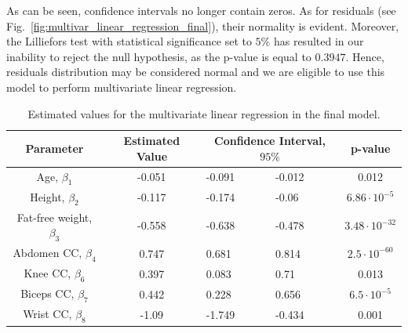 \documentclass[11pt,american,american]{article}
\begin{document}
\medskip

As can be seen, confidence intervals no longer contain zeros. As for residuals (see Fig.~\ref{fig:multivar_linear_regression_final}), their normality is evident. Moreover, the Lilliefors test with statistical significance set to $5\%$ has resulted in our inability to reject the null hypothesis, as the p-value is equal to $0.3947$. Hence, residuals distribution may be considered normal and we are eligible to use this model to perform multivariate linear regression.

\newpage

\vspace*{\fill}
\renewcommand{\arraystretch}{1.2}
\begin{table}[ht!]
	\centering
	\begin{tabular}{|c||c||p{2cm}|p{2cm}|c|}
		\hline 
		Parameter &  Estimated Value & \multicolumn{2}{c|}{Confidence Interval, $95\%$} & p-value \\ 
		\hline \hline 
		Age, $\beta_{1}$ & -0.051 & -0.091 &  -0.012 & 0.012\\ 
		\hline 
		Height, $\beta_{2}$ & -0.117 & -0.174 & -0.06  & $6.86 \cdot 10^{-5}$ \\
		\hline 
		Fat-free weight, $\beta_{3}$ & -0.558 & -0.638 & -0.478 & $3.48 \cdot 10^{-32}$ \\
		\hline
		Abdomen CC, $\beta_{4}$ & 0.747 & 0.681 & 0.814 & $2.5 \cdot 10^{-60}$ \\
		\hline
		Knee CC, $\beta_{6}$ & 0.397 & 0.083 & 0.71 & 0.013 \\
		\hline
		Biceps CC, $\beta_{7}$ & 0.442 & 0.228 & 0.656 & $6.5 \cdot 10^{-5}$ \\
		\hline
		Wrist CC, $\beta_{8}$ & -1.09 & -1.749 & -0.434 & 0.001 \\
		\hline
	\end{tabular} 
	\caption{Estimated values for the multivariate linear regression in the final model.}
	\label{tab:multivar_regression_final}
\end{table}

\vspace*{\fill}
\end{document}
